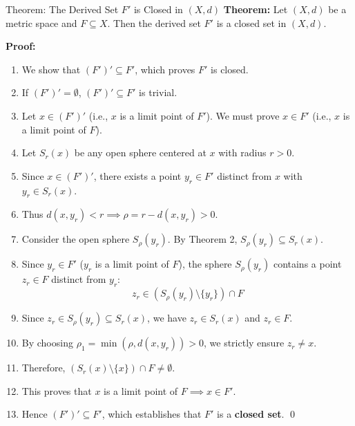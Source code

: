 \documentclass[11pt,a4paper]{article}
\begin{document}
\begin{exbox}{Theorem: The Derived Set $F'$ is Closed in $(X, d)$}
\textbf{Theorem:} Let $(X, d)$ be a metric space and $F \subseteq X$. Then the derived set $F'$ is a closed set in $(X, d)$.

\textbf{Proof:}
\begin{enumerate}
    \item We show that $(F')' \subseteq F'$, which proves $F'$ is closed.
    \item If $(F')' = \emptyset$, $(F')' \subseteq F'$ is trivial.
    \item Let $x \in (F')'$ (i.e., $x$ is a limit point of $F'$). We must prove $x \in F'$ (i.e., $x$ is a limit point of $F$).
    \item Let $S_r(x)$ be any open sphere centered at $x$ with radius $r > 0$.
    \item Since $x \in (F')'$, there exists a point $y_r \in F'$ distinct from $x$ with $y_r \in S_r(x)$.
    \item Thus $d(x, y_r) < r \implies \rho = r - d(x, y_r) > 0$.
    \item Consider the open sphere $S_\rho(y_r)$. By Theorem 2, $S_\rho(y_r) \subseteq S_r(x)$.
    \item Since $y_r \in F'$ ($y_r$ is a limit point of $F$), the sphere $S_\rho(y_r)$ contains a point $z_r \in F$ distinct from $y_r$:
    \begin{equation}
        z_r \in (S_\rho(y_r) \setminus \{y_r\}) \cap F
    \end{equation}
    \item Since $z_r \in S_\rho(y_r) \subseteq S_r(x)$, we have $z_r \in S_r(x)$ and $z_r \in F$.
    \item By choosing $\rho_1 = \min(\rho, d(x, y_r)) > 0$, we strictly ensure $z_r \neq x$.
    \item Therefore, $(S_r(x) \setminus \{x\}) \cap F \neq \emptyset$.
    \item This proves that $x$ is a limit point of $F \implies x \in F'$.
    \item Hence $(F')' \subseteq F'$, which establishes that $F'$ is a \textbf{closed set}. \qed
\end{enumerate}
\end{exbox}
\end{document}
